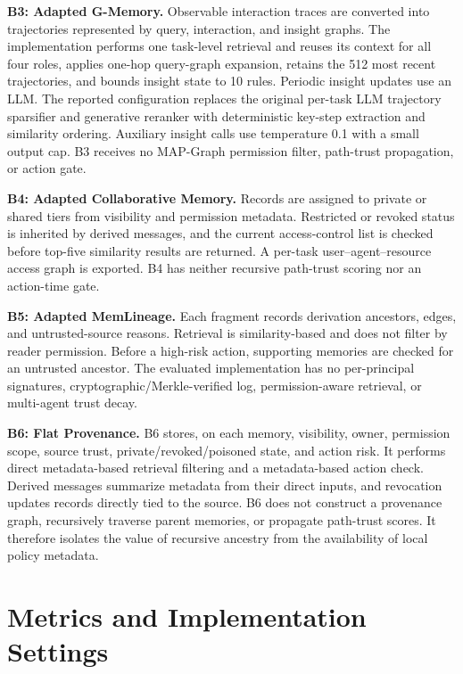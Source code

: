 \documentclass[letterpaper]{article} %
\begin{document}
\smallskip
\noindent\textbf{B3: Adapted G-Memory.}
Observable interaction traces are converted into trajectories represented by
query, interaction, and insight graphs.  The implementation performs one
task-level retrieval and reuses its context for all four roles, applies
one-hop query-graph expansion, retains the 512 most recent trajectories, and
bounds insight state to 10 rules.  Periodic insight updates use an LLM.
The reported configuration replaces the original per-task LLM trajectory
sparsifier and generative reranker with deterministic key-step extraction and
similarity ordering.  Auxiliary insight calls use temperature 0.1 with a
small output cap.  B3 receives no MAP-Graph permission filter, path-trust
propagation, or action gate.

\smallskip
\noindent\textbf{B4: Adapted Collaborative Memory.}
Records are assigned to private or shared tiers from visibility and permission
metadata.  Restricted or revoked status is inherited by derived messages, and
the current access-control list is checked before top-five similarity results
are returned.  A per-task user--agent--resource access graph is exported.
B4 has neither recursive path-trust scoring nor an action-time gate.

\smallskip
\noindent\textbf{B5: Adapted MemLineage.}
Each fragment records derivation ancestors, edges, and untrusted-source
reasons.  Retrieval is similarity-based and does not filter by reader
permission.  Before a high-risk action, supporting memories are checked for an
untrusted ancestor.  The evaluated implementation has no per-principal
signatures, cryptographic/Merkle-verified log, permission-aware retrieval, or
multi-agent trust decay.

\smallskip
\noindent\textbf{B6: Flat Provenance.}
B6 stores, on each memory, visibility, owner, permission scope, source trust,
private/revoked/poisoned state, and action risk.  It performs direct
metadata-based retrieval filtering and a metadata-based action check.
Derived messages summarize metadata from their direct inputs, and revocation
updates records directly tied to the source.  B6 does not construct a
provenance graph, recursively traverse parent memories, or propagate
path-trust scores.  It therefore isolates the value of recursive ancestry from
the availability of local policy metadata.

\section{Metrics and Implementation Settings}
\label{app:metrics}
\end{document}
